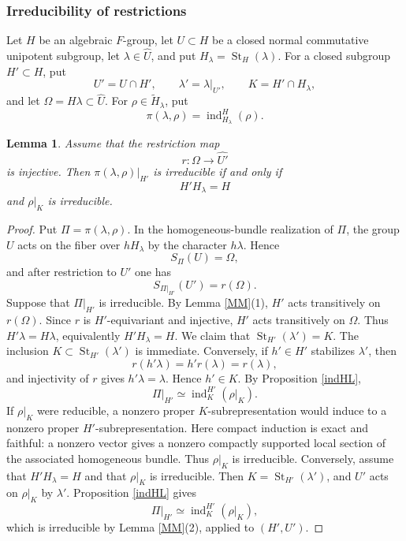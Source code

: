 \documentclass[11pt,a4paper,twoside]{amsart}
\newtheorem{lemma}[theorem]{Lemma}
\theoremstyle{definition}
\theoremstyle{remark}
\newcommand{\ind}{\operatorname{ind}}
\newcommand{\St}{\operatorname{St}}
\begin{document}
\subsubsection{Irreducibility of restrictions}
Let $H$ be an algebraic $F$-group, let $U\subset H$ be a closed normal commutative unipotent subgroup, let $\lambda\in\widehat U$, and put $H_\lambda=\St_H(\lambda)$. For a closed subgroup $H'\subset H$, put
$$
U'=U\cap H',\qquad \lambda'=\lambda|_{U'},\qquad K=H'\cap H_\lambda,
$$
and let $\Omega=H\lambda\subset\widehat U$. For $\rho\in\widetilde H_\lambda$, put
$$
\pi(\lambda,\rho)=\ind_{H_\lambda}^H(\rho).
$$
\begin{lemma}\label{3.12}
Assume that the restriction map
$$
r:\Omega\longrightarrow\widehat{U'}
$$
is injective. Then $\pi(\lambda,\rho)|_{H'}$ is irreducible if and only if
$$
H'H_\lambda=H
$$
and $\rho|_K$ is irreducible.
\end{lemma}
\begin{proof}
Put $\Pi=\pi(\lambda,\rho)$. In the homogeneous-bundle realization of $\Pi$, the group $U$ acts on the fiber over $hH_\lambda$ by the character $h\lambda$. Hence
$$
S_\Pi(U)=\Omega,
$$
and after restriction to $U'$ one has
$$
S_{\Pi|_{H'}}(U')=r(\Omega).
$$
Suppose that $\Pi|_{H'}$ is irreducible. By Lemma \ref{MM}(1), $H'$ acts transitively on $r(\Omega)$. Since $r$ is $H'$-equivariant and injective, $H'$ acts transitively on $\Omega$. Thus $H'\lambda=H\lambda$, equivalently $H'H_\lambda=H$.
We claim that $\St_{H'}(\lambda')=K$. The inclusion $K\subset\St_{H'}(\lambda')$ is immediate. Conversely, if $h'\in H'$ stabilizes $\lambda'$, then
$$
r(h'\lambda)=h'r(\lambda)=r(\lambda),
$$
and injectivity of $r$ gives $h'\lambda=\lambda$. Hence $h'\in K$.
By Proposition \ref{indHL},
$$
\Pi|_{H'}\simeq\ind_K^{H'}(\rho|_K).
$$
If $\rho|_K$ were reducible, a nonzero proper $K$-subrepresentation would induce to a nonzero proper $H'$-subrepresentation. Here compact induction is exact and faithful: a nonzero vector gives a nonzero compactly supported local section of the associated homogeneous bundle. Thus $\rho|_K$ is irreducible.
Conversely, assume that $H'H_\lambda=H$ and that $\rho|_K$ is irreducible. Then $K=\St_{H'}(\lambda')$, and $U'$ acts on $\rho|_K$ by $\lambda'$. Proposition \ref{indHL} gives
$$
\Pi|_{H'}\simeq\ind_K^{H'}(\rho|_K),
$$
which is irreducible by Lemma \ref{MM}(2), applied to $(H',U')$.
\end{proof}
\end{document}
